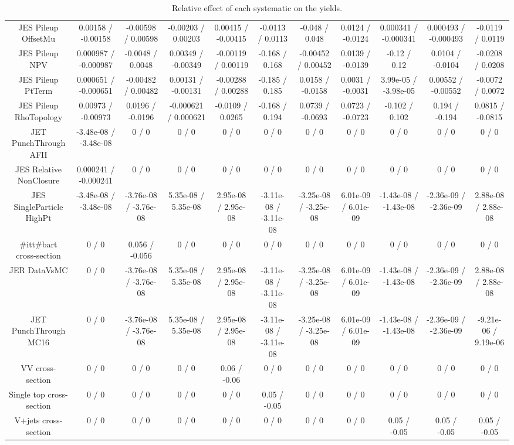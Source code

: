\begin{table}[htbp]
\begin{center}
\begin{tabular}{|c|c|c|c|c|c|c|c|c|c|c|}
  JES Pileup OffsetMu & 0.00158 / -0.00158 & -0.00598 / 0.00598 & -0.00203 / 0.00203 & 0.00415 / -0.00415 & -0.0113 / 0.0113 & -0.048 / 0.048 & 0.0124 / -0.0124 & 0.000341 / -0.000341 & 0.000493 / -0.000493 & -0.0119 / 0.0119 \\ 
  JES Pileup NPV & 0.000987 / -0.000987 & -0.0048 / 0.0048 & 0.00349 / -0.00349 & -0.00119 / 0.00119 & -0.168 / 0.168 & -0.00452 / 0.00452 & 0.0139 / -0.0139 & -0.12 / 0.12 & 0.0104 / -0.0104 & -0.0208 / 0.0208 \\ 
  JES Pileup PtTerm & 0.000651 / -0.000651 & -0.00482 / 0.00482 & 0.00131 / -0.00131 & -0.00288 / 0.00288 & -0.185 / 0.185 & 0.0158 / -0.0158 & 0.0031 / -0.0031 & 3.99e-05 / -3.98e-05 & 0.00552 / -0.00552 & -0.0072 / 0.0072 \\ 
  JES Pileup RhoTopology & 0.00973 / -0.00973 & 0.0196 / -0.0196 & -0.000621 / 0.000621 & -0.0109 / 0.0265 & -0.168 / 0.194 & 0.0739 / -0.0693 & 0.0723 / -0.0723 & -0.102 / 0.102 & 0.194 / -0.194 & 0.0815 / -0.0815 \\ 
  JET PunchThrough AFII & -3.48e-08 / -3.48e-08 & 0 / 0 & 0 / 0 & 0 / 0 & 0 / 0 & 0 / 0 & 0 / 0 & 0 / 0 & 0 / 0 & 0 / 0 \\ 
  JES Relative NonClosure & 0.000241 / -0.000241 & 0 / 0 & 0 / 0 & 0 / 0 & 0 / 0 & 0 / 0 & 0 / 0 & 0 / 0 & 0 / 0 & 0 / 0 \\ 
  JES SingleParticle HighPt & -3.48e-08 / -3.48e-08 & -3.76e-08 / -3.76e-08 & 5.35e-08 / 5.35e-08 & 2.95e-08 / 2.95e-08 & -3.11e-08 / -3.11e-08 & -3.25e-08 / -3.25e-08 & 6.01e-09 / 6.01e-09 & -1.43e-08 / -1.43e-08 & -2.36e-09 / -2.36e-09 & 2.88e-08 / 2.88e-08 \\ 
  #it{t#bar{t}} cross-section & 0 / 0 & 0.056 / -0.056 & 0 / 0 & 0 / 0 & 0 / 0 & 0 / 0 & 0 / 0 & 0 / 0 & 0 / 0 & 0 / 0 \\ 
  JER DataVsMC & 0 / 0 & -3.76e-08 / -3.76e-08 & 5.35e-08 / 5.35e-08 & 2.95e-08 / 2.95e-08 & -3.11e-08 / -3.11e-08 & -3.25e-08 / -3.25e-08 & 6.01e-09 / 6.01e-09 & -1.43e-08 / -1.43e-08 & -2.36e-09 / -2.36e-09 & 2.88e-08 / 2.88e-08 \\ 
  JET PunchThrough MC16 & 0 / 0 & -3.76e-08 / -3.76e-08 & 5.35e-08 / 5.35e-08 & 2.95e-08 / 2.95e-08 & -3.11e-08 / -3.11e-08 & -3.25e-08 / -3.25e-08 & 6.01e-09 / 6.01e-09 & -1.43e-08 / -1.43e-08 & -2.36e-09 / -2.36e-09 & -9.21e-06 / 9.19e-06 \\ 
  VV cross-section & 0 / 0 & 0 / 0 & 0 / 0 & 0.06 / -0.06 & 0 / 0 & 0 / 0 & 0 / 0 & 0 / 0 & 0 / 0 & 0 / 0 \\ 
  Single top cross-section & 0 / 0 & 0 / 0 & 0 / 0 & 0 / 0 & 0.05 / -0.05 & 0 / 0 & 0 / 0 & 0 / 0 & 0 / 0 & 0 / 0 \\ 
  V+jets cross-section & 0 / 0 & 0 / 0 & 0 / 0 & 0 / 0 & 0 / 0 & 0 / 0 & 0 / 0 & 0.05 / -0.05 & 0.05 / -0.05 & 0.05 / -0.05 \\ 
\hline 
\end{tabular} 
\caption{Relative effect of each systematic on the yields.} 
\end{center} 
\end{table} 
